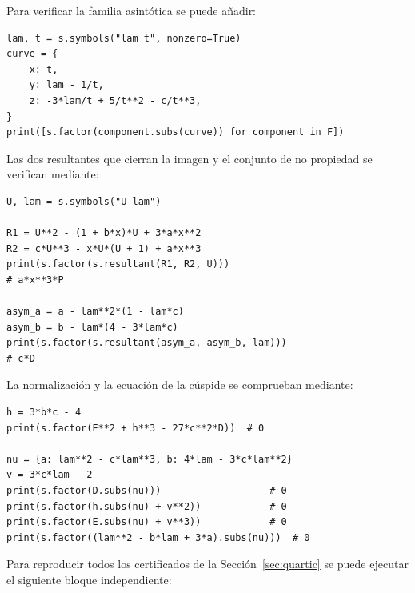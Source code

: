 \documentclass[11pt]{article}
\theoremstyle{definition}
\theoremstyle{remark}
\begin{document}
Para verificar la familia asint\'otica se puede a\~nadir:

\small
\begin{verbatim}
lam, t = s.symbols("lam t", nonzero=True)
curve = {
    x: t,
    y: lam - 1/t,
    z: -3*lam/t + 5/t**2 - c/t**3,
}
print([s.factor(component.subs(curve)) for component in F])
\end{verbatim}
\normalsize

Las dos resultantes que cierran la imagen y el conjunto de no propiedad se
verifican mediante:

\small
\begin{verbatim}
U, lam = s.symbols("U lam")

R1 = U**2 - (1 + b*x)*U + 3*a*x**2
R2 = c*U**3 - x*U*(U + 1) + a*x**3
print(s.factor(s.resultant(R1, R2, U)))
# a*x**3*P

asym_a = a - lam**2*(1 - lam*c)
asym_b = b - lam*(4 - 3*lam*c)
print(s.factor(s.resultant(asym_a, asym_b, lam)))
# c*D
\end{verbatim}
\normalsize

La normalizaci\'on y la ecuaci\'on de la c\'uspide se comprueban mediante:

\small
\begin{verbatim}
h = 3*b*c - 4
print(s.factor(E**2 + h**3 - 27*c**2*D))  # 0

nu = {a: lam**2 - c*lam**3, b: 4*lam - 3*c*lam**2}
v = 3*c*lam - 2
print(s.factor(D.subs(nu)))                   # 0
print(s.factor(h.subs(nu) + v**2))            # 0
print(s.factor(E.subs(nu) + v**3))            # 0
print(s.factor((lam**2 - b*lam + 3*a).subs(nu)))  # 0
\end{verbatim}
\normalsize

Para reproducir todos los certificados de la Secci\'on~\ref{sec:quartic} se
puede ejecutar el siguiente bloque independiente:
\end{document}
